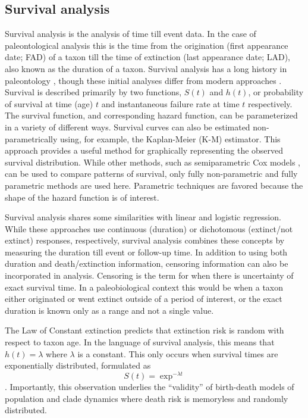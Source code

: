 \documentclass[12pt,letterpaper]{article}
\begin{document}
\subsection{Survival analysis} \label{sec:surv}
Survival analysis is the analysis of time till event data. In the case of paleontological analysis this is the time from the origination (first appearance date; FAD) of a taxon till the time of extinction (last appearance date; LAD), also known as the duration of a taxon. Survival analysis has a long history in paleontology \citep{Simpson1944,VanValen1973}, though these initial analyses differ from modern approaches \citep{Kleinbaum2005}. Survival is described primarily by two functions, \(S(t)\) and \(h(t)\), or probability of survival at time (age) \(t\) and instantaneous failure rate at time \(t\) respectively. The survival function, and corresponding hazard function, can be parameterized in a variety of different ways. Survival curves can also be estimated non-parametrically using, for example, the Kaplan-Meier (K-M) estimator. This approach provides a useful method for graphically representing the observed survival distribution. While other methods, such as semiparametric Cox models \citep{Kleinbaum2005}, can be used to compare patterns of survival, only fully non-parametric and fully parametric methods are used here. Parametric techniques are favored because the shape of the hazard function is of interest.

Survival analysis shares some similarities with linear and logistic regression. While these approaches use continuous (duration) or dichotomous (extinct/not extinct) responses, respectively, survival analysis combines these concepts by measuring the duration till event or follow-up time. In addition to using both duration and death/extinction information, censoring information can also be incorporated in analysis. Censoring is the term for when there is uncertainty of exact survival time. In a paleobiological context this would be when a taxon either originated or went extinct outside of a period of interest, or the exact duration is known only as a range and not a single value.

The Law of Constant extinction \citep{VanValen1973} predicts that extinction risk is random with respect to taxon age. In the language of survival analysis, this means that \(h(t) = \lambda\) where \(\lambda\) is a constant. This only occurs when survival times are exponentially distributed, formulated as 
\begin{equation}
  S(t) = \exp ^{- \lambda t}
  \label{eq:expsurv}
\end{equation}. Importantly, this observation underlies the ``validity'' of birth-death models of population and clade dynamics where death risk is memoryless and randomly distributed.
\end{document}
